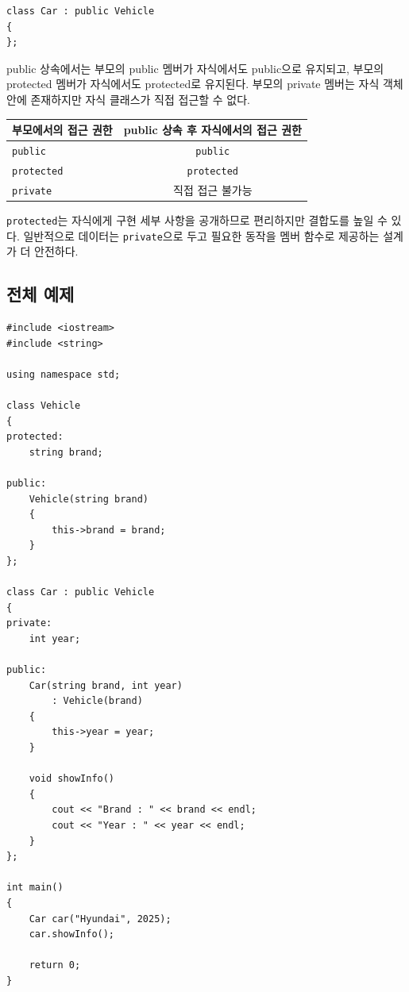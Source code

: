 \documentclass[11pt,a4paper]{article}
\begin{document}
\begin{lstlisting}
class Car : public Vehicle
{
};
\end{lstlisting}

public 상속에서는 부모의 public 멤버가 자식에서도 public으로 유지되고, 부모의 protected 멤버가 자식에서도 protected로 유지된다. 부모의 private 멤버는 자식 객체 안에 존재하지만 자식 클래스가 직접 접근할 수 없다.

\begin{center}
\begin{tabular}{lc}
\toprule
부모에서의 접근 권한 & public 상속 후 자식에서의 접근 권한 \\
\midrule
\texttt{public} & \texttt{public} \\
\texttt{protected} & \texttt{protected} \\
\texttt{private} & 직접 접근 불가능 \\
\bottomrule
\end{tabular}
\end{center}

\begin{importantbox}
\texttt{protected}는 자식에게 구현 세부 사항을 공개하므로 편리하지만 결합도를 높일 수 있다. 일반적으로 데이터는 \texttt{private}으로 두고 필요한 동작을 멤버 함수로 제공하는 설계가 더 안전하다.
\end{importantbox}

\subsection{전체 예제}
\begin{lstlisting}
#include <iostream>
#include <string>

using namespace std;

class Vehicle
{
protected:
    string brand;

public:
    Vehicle(string brand)
    {
        this->brand = brand;
    }
};

class Car : public Vehicle
{
private:
    int year;

public:
    Car(string brand, int year)
        : Vehicle(brand)
    {
        this->year = year;
    }

    void showInfo()
    {
        cout << "Brand : " << brand << endl;
        cout << "Year : " << year << endl;
    }
};

int main()
{
    Car car("Hyundai", 2025);
    car.showInfo();

    return 0;
}
\end{lstlisting}
\end{document}
